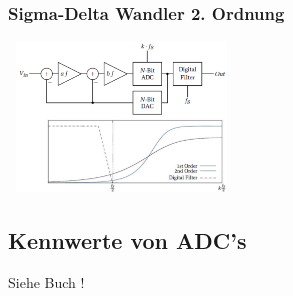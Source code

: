 \subsubsection{Sigma-Delta Wandler 2. Ordnung }
\includegraphics[width=6cm, height =4cm]{pictures/deltaSigma2}



\subsection{Kennwerte von ADC's}
Siehe Buch !
